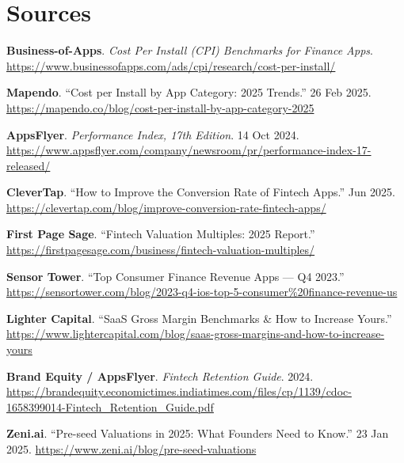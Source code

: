 \documentclass[11pt,letterpaper]{article}
\begin{document}
\newpage
\section*{Sources}
\begin{enumerate}[label={[{\arabic*}]}]

\item \textbf{Business-of-Apps}. \textit{Cost Per Install (CPI) Benchmarks for Finance Apps}.  
      \url{https://www.businessofapps.com/ads/cpi/research/cost-per-install/}

\item \textbf{Mapendo}. ``Cost per Install by App Category: 2025 Trends.'' 26 Feb 2025.  
      \url{https://mapendo.co/blog/cost-per-install-by-app-category-2025}

\item \textbf{AppsFlyer}. \textit{Performance Index, 17th Edition}. 14 Oct 2024.  
      \url{https://www.appsflyer.com/company/newsroom/pr/performance-index-17-released/}

\item \textbf{CleverTap}. ``How to Improve the Conversion Rate of Fintech Apps.'' Jun 2025.  
      \url{https://clevertap.com/blog/improve-conversion-rate-fintech-apps/}

\item \textbf{First Page Sage}. ``Fintech Valuation Multiples: 2025 Report.''  
      \url{https://firstpagesage.com/business/fintech-valuation-multiples/}

\item \textbf{Sensor Tower}. ``Top Consumer Finance Revenue Apps --- Q4 2023.''  
      \url{https://sensortower.com/blog/2023-q4-ios-top-5-consumer%20finance-revenue-us}

\item \textbf{Lighter Capital}. ``SaaS Gross Margin Benchmarks \& How to Increase Yours.''  
      \url{https://www.lightercapital.com/blog/saas-gross-margins-and-how-to-increase-yours}

\item \textbf{Brand Equity / AppsFlyer}. \textit{Fintech Retention Guide}. 2024.  
      \url{https://brandequity.economictimes.indiatimes.com/files/cp/1139/cdoc-1658399014-Fintech_Retention_Guide.pdf}

\item \textbf{Zeni.ai}. ``Pre-seed Valuations in 2025: What Founders Need to Know.'' 23 Jan 2025.  
      \url{https://www.zeni.ai/blog/pre-seed-valuations}


\end{enumerate}
\end{document}

